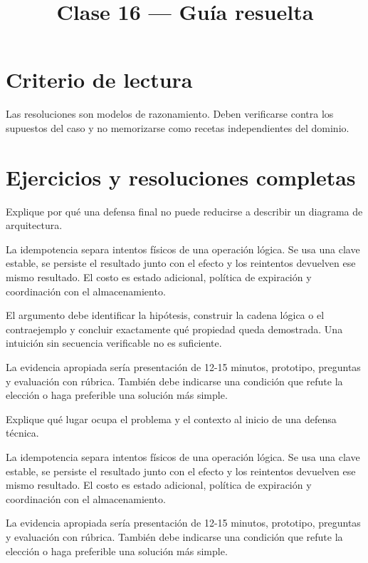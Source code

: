 \documentclass[variant=guia,cover=institutional,mode=screen]{ua-engineering-v6-article}
\title{Clase 16 --- Guía resuelta}
\author{\UAProfessor}
\date{\UADate}
\begin{document}
\section{Criterio de lectura}
Las resoluciones son modelos de razonamiento. Deben verificarse contra los supuestos del caso y no memorizarse como recetas independientes del dominio.

\section{Ejercicios y resoluciones completas}
\begin{uaexercise}
Explique por qué una defensa final no puede reducirse a describir un diagrama de arquitectura.
\end{uaexercise}
\begin{uaanswer}
La idempotencia separa intentos físicos de una operación lógica. Se usa una clave estable, se persiste el resultado junto con el efecto y los reintentos devuelven ese mismo resultado. El costo es estado adicional, política de expiración y coordinación con el almacenamiento.

El argumento debe identificar la hipótesis, construir la cadena lógica o el contraejemplo y concluir exactamente qué propiedad queda demostrada. Una intuición sin secuencia verificable no es suficiente.

La evidencia apropiada sería presentación de 12-15 minutos, prototipo, preguntas y evaluación con rúbrica. También debe indicarse una condición que refute la elección o haga preferible una solución más simple.
\end{uaanswer}

\begin{uaexercise}
Explique qué lugar ocupa el problema y el contexto al inicio de una defensa técnica.
\end{uaexercise}
\begin{uaanswer}
La idempotencia separa intentos físicos de una operación lógica. Se usa una clave estable, se persiste el resultado junto con el efecto y los reintentos devuelven ese mismo resultado. El costo es estado adicional, política de expiración y coordinación con el almacenamiento.

La evidencia apropiada sería presentación de 12-15 minutos, prototipo, preguntas y evaluación con rúbrica. También debe indicarse una condición que refute la elección o haga preferible una solución más simple.
\end{uaanswer}
\end{document}
